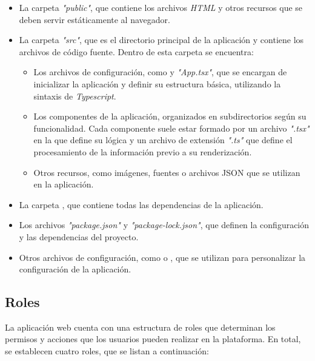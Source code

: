\begin{itemize}

  \item La carpeta \textit{"public"}, que contiene los archivos \textit{HTML} y otros recursos que se deben servir estáticamente al navegador.

  \item La carpeta \textit{"src"}, que es el directorio principal de la aplicación y contiene los archivos de código fuente. Dentro de esta carpeta se encuentra:

    \begin{itemize}

      \item Los archivos de configuración, como  y \textit{"App.tsx"}, que se encargan de inicializar la aplicación y definir su estructura básica, utilizando la sintaxis de \textit{Typescript}.
  
      \item Los componentes de la aplicación, organizados en subdirectorios según su funcionalidad. Cada componente suele estar formado por un archivo \textit{".tsx"} en la que define su lógica y un archivo de extensión \textit{".ts"} que define el procesamiento de la información previo a su renderización.

      \item Otros recursos, como imágenes, fuentes o archivos JSON que se utilizan en la aplicación.

    \end{itemize}

  \item La carpeta , que contiene todas las dependencias de la aplicación.

  \item Los archivos \textit{"package.json"} y \textit{"package-lock.json"}, que definen la configuración y las dependencias del proyecto.

  \item Otros archivos de configuración, como  o , que se utilizan para personalizar la configuración de la aplicación.

\end{itemize}


\subsection{Roles}

La aplicación web cuenta con una estructura de roles que determinan los permisos y acciones que los usuarios pueden realizar en la plataforma. En total, se establecen cuatro roles, que se listan a continuación:

